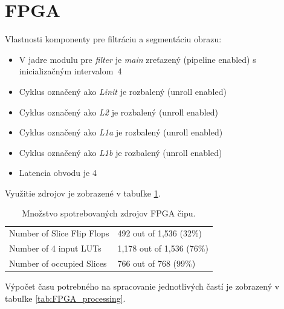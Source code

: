 \documentclass[11pt,a4paper]{article}
\begin{document}
\section{FPGA}

Vlastnosti komponenty pre filtráciu a segmentáciu obrazu:\\[-2em]

\begin{itemize}
    \item V jadre modulu pre \textit{filter} je \textit{main} zreťazený (pipeline enabled) s inicializačným intervalom~4\\[-2em]
    \item Cyklus označený ako \textit{Linit} je rozbalený (unroll enabled)\\[-2em]
    \item Cyklus označený ako \textit{L2} je rozbalený (unroll enabled)\\[-2em]
    \item Cyklus označený ako \textit{L1a} je rozbalený (unroll enabled)\\[-2em]
    \item Cyklus označený ako \textit{L1b} je rozbalený (unroll enabled)\\[-2em]
    \item Latencia obvodu je 4
\end{itemize}

Využitie zdrojov je zobrazené v tabuľke \ref{tab:fpga_resources}.

\begin{table}[H]
  \begin{center}
    \begin{tabular}{l|l}
        Number of Slice Flip Flops & 492 \hspace{1.65mm} out of 1,536 (32\%) \\
        Number of 4 input LUTs     & 1,178 out of 1,536 (76\%) \\
        Number of occupied Slices  & 766 \hspace{1.65mm} out of 768 \hspace{1.65mm} (99\%)   \\
    \end{tabular}
    \caption{Množstvo spotrebovaných zdrojov FPGA čipu.}
    \label{tab:fpga_resources}
  \end{center}
\end{table}

Výpočet času potrebného na spracovanie jednotlivých častí je zobrazený v tabuľke \ref{tab:FPGA_processing}.
\end{document}

